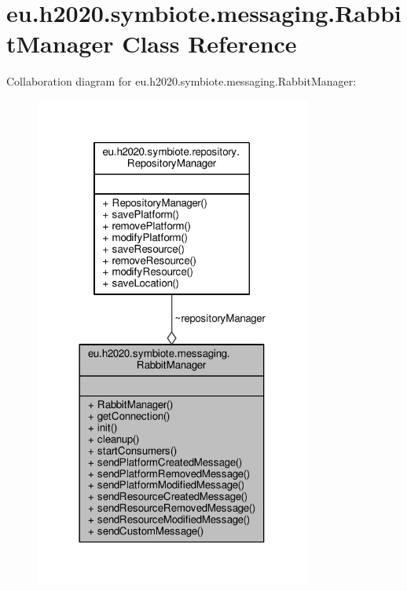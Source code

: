 \hypertarget{classeu_1_1h2020_1_1symbiote_1_1messaging_1_1RabbitManager}{}\section{eu.\+h2020.\+symbiote.\+messaging.\+Rabbit\+Manager Class Reference}
\label{classeu_1_1h2020_1_1symbiote_1_1messaging_1_1RabbitManager}


Collaboration diagram for eu.\+h2020.\+symbiote.\+messaging.\+Rabbit\+Manager\+:
\nopagebreak
\begin{figure}[H]
\begin{center}
\leavevmode
\includegraphics[width=258pt]{classeu_1_1h2020_1_1symbiote_1_1messaging_1_1RabbitManager__coll__graph}
\end{center}
\end{figure}
